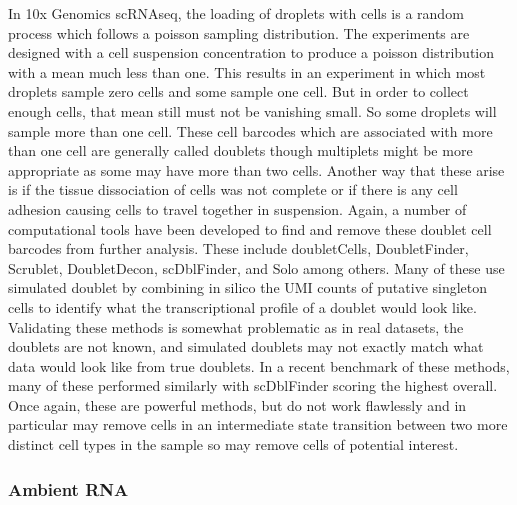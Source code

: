 \par{
In 10x Genomics scRNAseq, the loading of droplets with cells is a random process which follows a poisson sampling distribution. The experiments are designed with a cell suspension concentration to produce a poisson distribution with a mean much less than one. This results in an experiment in which most droplets sample zero cells and some sample one cell. But in order to collect enough cells, that mean still must not be vanishing small. So some droplets will sample more than one cell. These cell barcodes which are associated with more than one cell are generally called doublets though multiplets might be more appropriate as some may have more than two cells. Another way that these arise is if the tissue dissociation of cells was not complete or if there is any cell adhesion causing cells to travel together in suspension. Again, a number of computational tools have been developed to find and remove these doublet cell barcodes from further analysis. These include doubletCells\cite{doubletCells}, DoubletFinder\cite{doubletfinder}, Scrublet\cite{scrublet}, DoubletDecon\cite{doubletdecon}, scDblFinder\cite{scDblFinder}, and Solo\cite{solo} among others. Many of these use simulated doublet by combining in silico the UMI counts of putative singleton cells to identify what the transcriptional profile of a doublet would look like. Validating these methods is somewhat problematic as in real datasets, the doublets are not known, and simulated doublets may not exactly match what data would look like from true doublets. In a recent benchmark of these methods, many of these performed similarly with scDblFinder scoring the highest overall\cite{doubletbench}. Once again, these are powerful methods, but do not work flawlessly and in particular may remove cells in an intermediate state transition between two more distinct cell types in the sample so may remove cells of potential interest.
}


\subsubsection{Ambient RNA}

